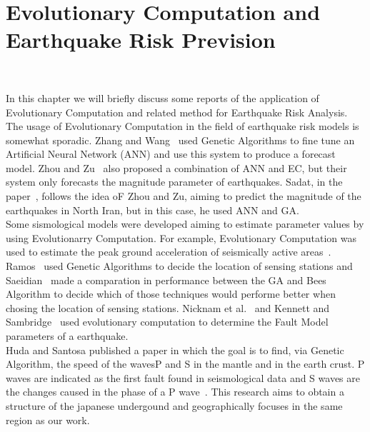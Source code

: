 \chapter{Evolutionary Computation and Earthquake Risk Prevision}~\label{chapter4}


In this chapter we will briefly discuss some reports of the application of Evolutionary Computation and related method for Earthquake Risk Analysis.\\

The usage of Evolutionary Computation in the field of earthquake risk models is somewhat sporadic. Zhang and Wang~\cite{Zhang2012} used Genetic Algorithms to fine tune an Artificial Neural Network (ANN) and use this system to produce a forecast model. Zhou and Zu~\cite{Feiyan2014} also proposed a combination of ANN and EC, but their system only forecasts the magnitude parameter of earthquakes. Sadat, in the paper~\cite{sadat2015application}, follows the idea oF Zhou and Zu, aiming to predict the magnitude of the earthquakes in North Iran, but in this case, he used ANN and GA.\\

Some sismological models were developed aiming to estimate parameter values by using Evolutionarry Computation. For example, Evolutionary Computation was used to estimate the peak ground acceleration of seismically active areas~\cite{pga_Kerh,Kermani2009,Cabalar2009,Kerh2010,Kerh2015}. Ramos~\cite{Ramos2011} used Genetic Algorithms to decide the location of sensing stations and Saeidian~\cite{saeidian2016evaluation} made a comparation in performance between the GA and Bees Algorithm to decide which of those techniques would performe better when chosing the location of sensing stations. Nicknam et al.~\cite{Nicknam2010} and Kennett and Sambridge~\cite{Kennett1992} used evolutionary computation to determine the Fault Model parameters of a earthquake.\\

Huda and Santosa \cite{ijse5762} published a paper in which the goal is to find, via Genetic Algorithm, the speed of the wavesP and S in the mantle and in the earth crust. P waves are indicated as the first fault found  in seismological data and S waves are the changes caused in the phase of a P wave~\cite{ijse5762}. This research aims to obtain a structure of the japanese undergound and geographically focuses in the same region as our work.\\